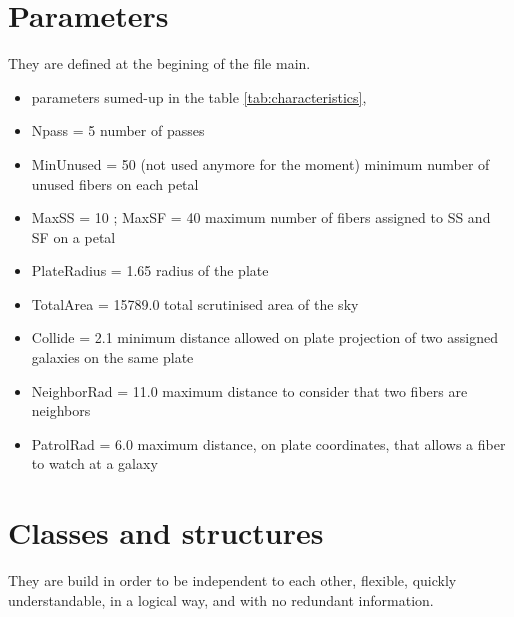 \documentclass[10pt]{extarticle}
\begin{document}
\begin{multicols}{2}
\section{Parameters}
They are defined at the begining of the file main.
\begin{itemize} 
	\item parameters sumed-up in the table \ref{tab:characteristics},
	\item Npass = 5 number of passes
	\item MinUnused = 50 (not used anymore for the moment) minimum number of unused fibers on each petal
	\item MaxSS = 10 ; MaxSF = 40 maximum number of fibers assigned to SS and SF on a petal
	\item PlateRadius = 1.65 radius of the plate
	\item TotalArea = 15789.0 total scrutinised area of the sky
	\item Collide = 2.1 minimum distance allowed on plate projection of two assigned galaxies on the same plate
	\item NeighborRad = 11.0 maximum distance to consider that two fibers are neighbors
	\item PatrolRad = 6.0 maximum distance, on plate coordinates, that allows a fiber to watch at a galaxy
\end{itemize} 


\section{Classes and structures}
They are build in order to be independent to each other, flexible, quickly understandable, in a logical way, and with no redundant information.

\end{multicols}
\end{document}
